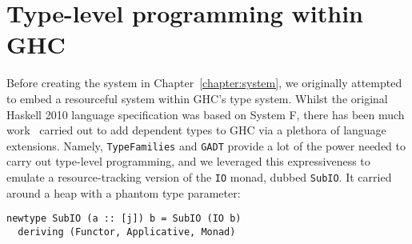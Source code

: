\section{Type-level programming within GHC}


Before creating the system in Chapter~\ref{chapter:system}, we
originally attempted to embed a resourceful system within GHC's type
system. Whilst the original Haskell 2010 language specification was
based on System F, there has been much
work~\cite{eisenberg2016}\cite{weirich2017} carried out to add
dependent types to GHC via a plethora of language extensions. Namely,
\texttt{TypeFamilies} and \texttt{GADT} provide a lot of the power
needed to carry out type-level programming, and we leveraged this
expressiveness to emulate a resource-tracking version of the
\texttt{IO} monad, dubbed \texttt{SubIO}. It
carried around a heap with a phantom type parameter:
\begin{verbatim}
newtype SubIO (a :: [j]) b = SubIO (IO b)
  deriving (Functor, Applicative, Monad)
\end{verbatim}

